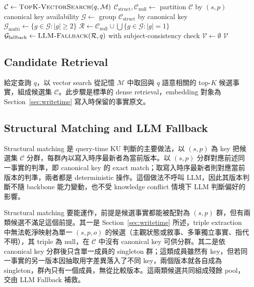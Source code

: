 \begin{algorithm}[htbp]
\caption{Query-time KU Resolution}
\label{alg:query}
$\mathcal{C} \gets \textsc{TopK-VectorSearch}(q, \mathcal{M})$\;
$\mathcal{C}_{\text{struct}}, \mathcal{C}_{\text{null}} \gets$ partition $\mathcal{C}$ by $(s, p)$ canonical key availability\;
$\mathcal{G} \gets$ group $\mathcal{C}_{\text{struct}}$ by canonical key\;
$\mathcal{G}_{\text{multi}} \gets \{g \in \mathcal{G} : |g| \geq 2\}$\;
$\mathcal{R} \gets \mathcal{C}_{\text{null}} \cup \bigcup \{g \in \mathcal{G} : |g| = 1\}$ 
$\mathcal{G}_{\text{fallback}} \gets \textsc{LLM-Fallback}(\mathcal{R}, q)$ with subject-consistency check\;
$\mathcal{V} \gets \emptyset$\;
\Return $\mathcal{V}$\;
\end{algorithm}

\subsection{Candidate Retrieval}
\label{subsec:candidate_retrieval}
給定查詢 $q$，以 vector search 從記憶 $\mathcal{M}$ 中取回與 $q$ 語意相關的 top-$K$ 候選事實，組成候選集 $\mathcal{C}$。此步驟是標準的 dense retrieval，embedding 對象為 Section~\ref{sec:writetime} 寫入時保留的事實原文。

\subsection{Structural Matching and LLM Fallback}
\label{subsec:structural_matching}
Structural matching 是 query-time KU 判斷的主要做法，以 $(s, p)$ 為 key 把候選集 $\mathcal{C}$ 分群，每群內以寫入時序最新者為當前版本。以 $(s, p)$ 分群對應前述同一事實的判準，即 canonical key 的 exact match；取寫入時序最新者則對應當前版本的判準，兩者都是 deterministic 操作。這個做法不呼叫 LLM，因此其版本判斷不隨 backbone 能力變動，也不受 knowledge conflict 情境下 LLM 判斷偏好的影響。

Structural matching 要能運作，前提是候選事實都能被配對為 $(s, p)$ 群，但有兩類候選不滿足這個前提。其一是 Section~\ref{sec:writetime} 所述，triple extraction 中無法乾淨映射為單一 $(s, p, o)$ 的候選（主觀狀態或敘事、多筆獨立事實、指代不明），其 triple 為 null，在 $\mathcal{C}$ 中沒有 canonical key 可供分群。其二是依 canonical key 分群後只含單一成員的 singleton 群；這類成員雖然有 key，但若同一事實的另一版本因抽取用字差異落入了不同 key，兩個版本就各自成為 singleton，群內只有一個成員，無從比較版本。這兩類候選共同組成殘餘 pool，交由 LLM Fallback 補救。

